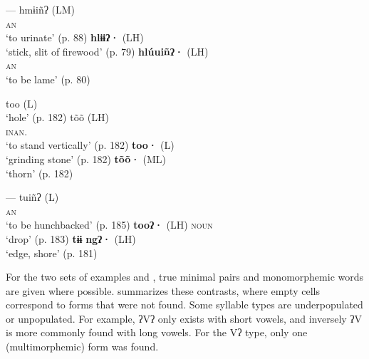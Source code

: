 \documentclass[output=paper]{langscibook}
\begin{document}
\ea
{}
     {---}
     {hmɨiñʔ (LM)\\
          \textsc{an}\\
          ‘to urinate’ (p. 88)
     }
     {\textbf{hlɨɨʔ·} (LH)\\
          \glt ‘stick, slit of firewood’ (p. 79)
     }
     {\textbf{hlúuiñʔ·} (LH)\\
     \textsc{an}\\
          \glt ‘to be lame’ (p. 80)
     }
\z

\newpage
\ea
{}
     {too (L) \\
          \glt ‘hole’ (p. 182)
     }
     {tõõ (LH)\\
     \textsc{inan}. \\
          \glt ‘to stand vertically’ (p. 182)
     }
     {\textbf{too·} (L) \\
          \glt ‘grinding stone’ (p. 182)
     }
     {\textbf{tõõ·} (ML)\\
          \glt ‘thorn’ (p. 182)
     }
\z



\ea
{}
     {---}
     {tuiñʔ (L)\\ \textsc{an}\\
          \glt ‘to be hunchbacked’ (p. 185)
     }
     {\textbf{tooʔ·} (LH) \textsc{noun} \\
          \glt ‘drop’ (p. 183)
     }
     {\textbf{tɨɨ} \textbf{ngʔ·} (LH)\\
          \glt ‘edge, shore’ (p. 181)
     }
\z



For the two sets of examples  and , true minimal pairs and monomorphemic words are given where possible.  summarizes these contrasts, where empty cells correspond to forms that were not found. Some syllable types are underpopulated or unpopulated. For example, ʔVʔ only exists with short vowels, and inversely ʔV is more commonly found with long vowels. For the Vʔ type, only one (multimorphemic) form was found.
\end{document}
